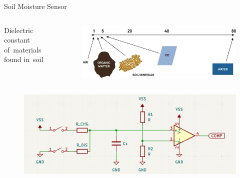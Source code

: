 \documentclass{beamer}
\begin{document}
\begin{frame}{Soil Moisture Sensor}
\centering
\begin{columns}
\begin{column}{.25\textwidth}
    \begin{flushright}
    Dielectric constant of~materials found in~soil
    \end{flushright}
\end{column}
\hfil
\begin{column}{.75\textwidth}
    \begin{figure}
        \includegraphics[width=\linewidth]{../thesis/fig/dielectric-constant.jpg}
    \end{figure}
\end{column}
\end{columns}
\begin{figure}
    \includegraphics[width=\linewidth]{../thesis/fig/principle-cap-measure.png}
\end{figure}
\end{frame}
\end{document}
